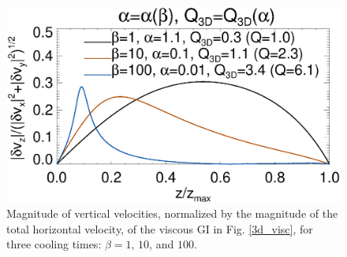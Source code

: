 \begin{figure}
  \includegraphics[width=\linewidth,clip=true,trim=0cm 0.cm 0.cm
    0.0cm]{figures/eigenvec_vz}
  \caption{Magnitude of vertical velocities, normalized by the
    magnitude of the total horizontal velocity, of the viscous GI in 
    Fig. \ref{3d_visc}, for three cooling times: $\beta=1,\,10$, and $100$. \label{3d_visc_vz}} 
\end{figure}
